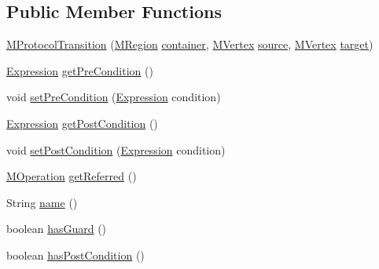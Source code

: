 \subsection*{Public Member Functions}
\begin{DoxyCompactItemize}
\item 
\hyperlink{classorg_1_1tzi_1_1use_1_1uml_1_1mm_1_1statemachines_1_1_m_protocol_transition_aab42c9a2f505d0d68d904e74e6a74757}{M\-Protocol\-Transition} (\hyperlink{classorg_1_1tzi_1_1use_1_1uml_1_1mm_1_1statemachines_1_1_m_region}{M\-Region} \hyperlink{classorg_1_1tzi_1_1use_1_1uml_1_1mm_1_1statemachines_1_1_m_transition_ace7d397d6075cffcdb50a7f8260b008e}{container}, \hyperlink{classorg_1_1tzi_1_1use_1_1uml_1_1mm_1_1statemachines_1_1_m_vertex}{M\-Vertex} \hyperlink{classorg_1_1tzi_1_1use_1_1uml_1_1mm_1_1statemachines_1_1_m_transition_a75e7dc92d45d783d8e0503e57c771133}{source}, \hyperlink{classorg_1_1tzi_1_1use_1_1uml_1_1mm_1_1statemachines_1_1_m_vertex}{M\-Vertex} \hyperlink{classorg_1_1tzi_1_1use_1_1uml_1_1mm_1_1statemachines_1_1_m_transition_aaaa81e7ce0744826e2b8e81a364a51b5}{target})
\item 
\hyperlink{classorg_1_1tzi_1_1use_1_1uml_1_1ocl_1_1expr_1_1_expression}{Expression} \hyperlink{classorg_1_1tzi_1_1use_1_1uml_1_1mm_1_1statemachines_1_1_m_protocol_transition_ade3c43ff4eab1503c433d7561789903d}{get\-Pre\-Condition} ()
\item 
void \hyperlink{classorg_1_1tzi_1_1use_1_1uml_1_1mm_1_1statemachines_1_1_m_protocol_transition_a59ef227b641a6003b51840ff0a7c6637}{set\-Pre\-Condition} (\hyperlink{classorg_1_1tzi_1_1use_1_1uml_1_1ocl_1_1expr_1_1_expression}{Expression} condition)
\item 
\hyperlink{classorg_1_1tzi_1_1use_1_1uml_1_1ocl_1_1expr_1_1_expression}{Expression} \hyperlink{classorg_1_1tzi_1_1use_1_1uml_1_1mm_1_1statemachines_1_1_m_protocol_transition_af60c306f18695ee4c583d049079b40c8}{get\-Post\-Condition} ()
\item 
void \hyperlink{classorg_1_1tzi_1_1use_1_1uml_1_1mm_1_1statemachines_1_1_m_protocol_transition_a672041adcec4589ad621bc7f2d9cb2c5}{set\-Post\-Condition} (\hyperlink{classorg_1_1tzi_1_1use_1_1uml_1_1ocl_1_1expr_1_1_expression}{Expression} condition)
\item 
\hyperlink{classorg_1_1tzi_1_1use_1_1uml_1_1mm_1_1_m_operation}{M\-Operation} \hyperlink{classorg_1_1tzi_1_1use_1_1uml_1_1mm_1_1statemachines_1_1_m_protocol_transition_a8e3d5037f14b19f5566f6bbfeb7c73ee}{get\-Referred} ()
\item 
String \hyperlink{classorg_1_1tzi_1_1use_1_1uml_1_1mm_1_1statemachines_1_1_m_protocol_transition_a5d2d08cd289cdc37a4e57adac732a4d3}{name} ()
\item 
boolean \hyperlink{classorg_1_1tzi_1_1use_1_1uml_1_1mm_1_1statemachines_1_1_m_protocol_transition_afb858a5accfd4da34611940237ecf713}{has\-Guard} ()
\item 
boolean \hyperlink{classorg_1_1tzi_1_1use_1_1uml_1_1mm_1_1statemachines_1_1_m_protocol_transition_a2f60ae5dbe561e48200c09e9f5188877}{has\-Post\-Condition} ()
\end{DoxyCompactItemize}
